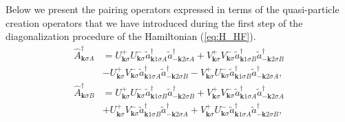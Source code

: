 \documentclass[aps,prb,showpacs,reprint]{revtex4-1}
\begin{document}
Below we present the pairing operators expressed in terms of the
quasi-particle creation operators that we have introduced during the first step
of the diagonalization
procedure of the Hamiltonian (\ref{eq:H_HF}).
\begin{equation}
\begin{split}
 \hat{A}^{\dagger}_{\mathbf{k}\sigma
A}&=U^+_{\mathbf{k}\sigma}U^-_{\mathbf{k}\sigma}\tilde{a}^{\dagger}_{\mathbf{k}
1\sigma A}\tilde{a}^{\dagger}_{-\mathbf{k}2\sigma
A}+V^+_{\mathbf{k}\sigma}V^-_{\mathbf{k}\sigma}\tilde{a}^{\dagger}_{\mathbf{k}
1\sigma B}\tilde{a}^{\dagger}_{-\mathbf{k}2\sigma
B}\\
&-U^+_{\mathbf{k}\sigma}V^-_{\mathbf{k}\sigma}\tilde{a}^{\dagger}_{\mathbf{k}
1\sigma A}\tilde{a}^{\dagger}_{-\mathbf{k}2\sigma
B}-V^+_{\mathbf{k}\sigma}U^-_{\mathbf{k}\sigma}\tilde{a}^{\dagger}_{\mathbf{k}
1\sigma B}\tilde{a}^{\dagger}_{-\mathbf{k}2\sigma A},\\
\hat{A}^{\dagger}_{\mathbf{k}\sigma
B}&=U^+_{\mathbf{k}\sigma}U^-_{\mathbf{k}\sigma}\tilde{a}^{\dagger}_{\mathbf{k}
1\sigma B}\tilde{a}^{\dagger}_{-\mathbf{k}2\sigma
B}+V^+_{\mathbf{k}\sigma}V^-_{\mathbf{k}\sigma}\tilde{a}^{\dagger}_{\mathbf{k}
1\sigma A}\tilde{a}^{\dagger}_{-\mathbf{k}2\sigma
A}\\
&+U^+_{\mathbf{k}\sigma}V^-_{\mathbf{k}\sigma}\tilde{a}^{\dagger}_{\mathbf{k}
1\sigma B}\tilde{a}^{\dagger}_{-\mathbf{k}2\sigma
A}+V^+_{\mathbf{k}\sigma}U^-_{\mathbf{k}\sigma}\tilde{a}^{\dagger}_{\mathbf{k}
1\sigma A}\tilde{a}^{\dagger}_{-\mathbf{k}2\sigma B},
\end{split}
\end{equation}
\end{document}
